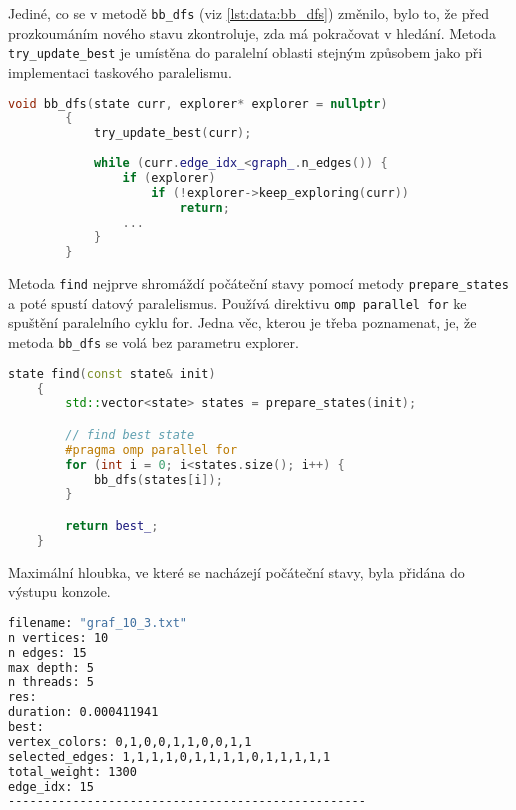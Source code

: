 Jediné, co se v metodě \texttt{bb\_dfs} (viz \ref{lst:data:bb_dfs}) změnilo, bylo to, že před prozkoumáním nového stavu zkontroluje, zda má pokračovat v hledání.
Metoda \texttt{try\_update\_best} je umístěna do paralelní oblasti stejným způsobem jako při implementaci taskového paralelismu.

\begin{lstlisting}[language=C++, label={lst:data:bb_dfs}, title={Metoda pro prohledávání stavového prostoru}]
        void bb_dfs(state curr, explorer* explorer = nullptr)
        {
            try_update_best(curr);
            
            while (curr.edge_idx_<graph_.n_edges()) {
                if (explorer)
                    if (!explorer->keep_exploring(curr))
                        return;
                ...
            }
        }
\end{lstlisting}

Metoda \texttt{find} nejprve shromáždí počáteční stavy pomocí metody \texttt{prepare\_states} a poté spustí datový paralelismus.
Používá direktivu \texttt{omp parallel for} ke spuštění paralelního cyklu for.
Jedna věc, kterou je třeba poznamenat, je, že metoda \texttt{bb\_dfs} se volá bez parametru explorer.

\begin{lstlisting}[language=C++, label={lst:data:find}, title={Metoda pro nalezení nejlepšího stavu}]
    state find(const state& init)
    {
        std::vector<state> states = prepare_states(init);

        // find best state
        #pragma omp parallel for
        for (int i = 0; i<states.size(); i++) {
            bb_dfs(states[i]);
        }

        return best_;
    }
\end{lstlisting}

Maximální hloubka, ve které se nacházejí počáteční stavy, byla přidána do výstupu konzole.

\begin{lstlisting}[language=bash, label={lst:data:console_log}, title={Příklad výpisu výsledků}]
filename: "graf_10_3.txt"
n vertices: 10
n edges: 15
max depth: 5
n threads: 5
res:
duration: 0.000411941
best:
vertex_colors: 0,1,0,0,1,1,0,0,1,1
selected_edges: 1,1,1,1,0,1,1,1,1,0,1,1,1,1,1
total_weight: 1300
edge_idx: 15
--------------------------------------------------
\end{lstlisting}









